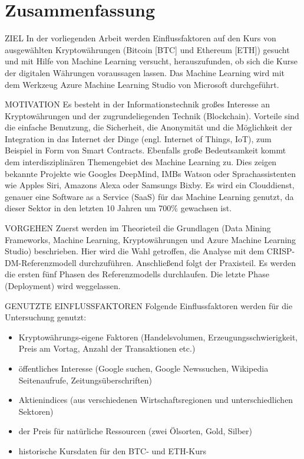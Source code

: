 \chapter*{Zusammenfassung}

{\normalsize ZIEL} \newline
In der vorliegenden Arbeit werden Einflussfaktoren auf den Kurs von ausgewählten Kryptowährungen (Bitcoin [BTC] und Ethereum [ETH]) gesucht und mit Hilfe von Machine Learning versucht, herauszufunden, ob sich die Kurse der digitalen Währungen voraussagen lassen. Das Machine Learning wird mit dem Werkzeug Azure Machine Learning Studio von Microsoft durchgeführt.

{\normalsize MOTIVATION} \newline
Es besteht in der Informationstechnik großes Interesse an Kryptowährungen und der zugrundeliegenden Technik (Blockchain). Vorteile sind die einfache Benutzung, die Sicherheit, die Anonymität und die Möglichkeit der Integration in das Internet der Dinge (engl. Internet of Things, IoT), zum Beispiel in Form von Smart Contracts. \newline
Ebenfalls große Bedeutsamkeit kommt dem interdisziplinären Themengebiet des Machine Learning zu. Dies zeigen bekannte Projekte wie Googles DeepMind, IMBs Watson oder Sprachassistenten wie Apples Siri, Amazons Alexa oder Samsungs Bixby.
\newline
Es wird ein Clouddienst, genauer eine Software as a Service (SaaS) für das Machine Learning genutzt, da dieser Sektor in den letzten 10 Jahren um 700\% gewachsen ist.

{\normalsize VORGEHEN} \newline
Zuerst werden im Theorieteil die Grundlagen (Data Mining Frameworks, Machine Learning, Kryptowährungen und Azure Machine Learning Studio) beschrieben. Hier wird die Wahl getroffen, die Analyse mit dem CRISP-DM-Referenzmodell durchzuführen.\newline
Anschließend folgt der Praxisteil. Es werden die ersten fünf Phasen des Referenzmodells durchlaufen. Die letzte Phase (Deployment) wird weggelassen.

{\normalsize GENUTZTE EINFLUSSFAKTOREN} \newline
Folgende Einflussfaktoren werden für die Untersuchung genutzt:
\begin{itemize}
\item Kryptowährungs-eigene Faktoren (Handelsvolumen, Erzeugungsschwierigkeit, Preis am Vortag, Anzahl der Transaktionen etc.)
\item öffentliches Interesse (Google suchen, Google Newssuchen, Wikipedia Seitenaufrufe, Zeitungsüberschriften)
\item Aktienindices (aus verschiedenen Wirtschaftsregionen und unterschiedlichen Sektoren)
\item der Preis für natürliche Ressourcen (zwei Ölsorten, Gold, Silber)
\item historische Kursdaten für den BTC- und ETH-Kurs
\end{itemize}

